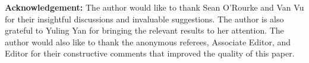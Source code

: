 \documentclass[reqno]{amsart}
\theoremstyle{plain}
\theoremstyle{definition}
\begin{document}



\medskip

{\bf Acknowledgement:} The author would like to thank Sean O'Rourke and Van Vu for their insightful discussions and invaluable suggestions.  The author is also grateful to Yuling Yan for bringing the relevant results \cite{YCF21,YW24} to her attention. The author would also like to thank the anonymous referees, Associate Editor, and Editor for their constructive comments that improved the quality of this paper.

\end{document}
